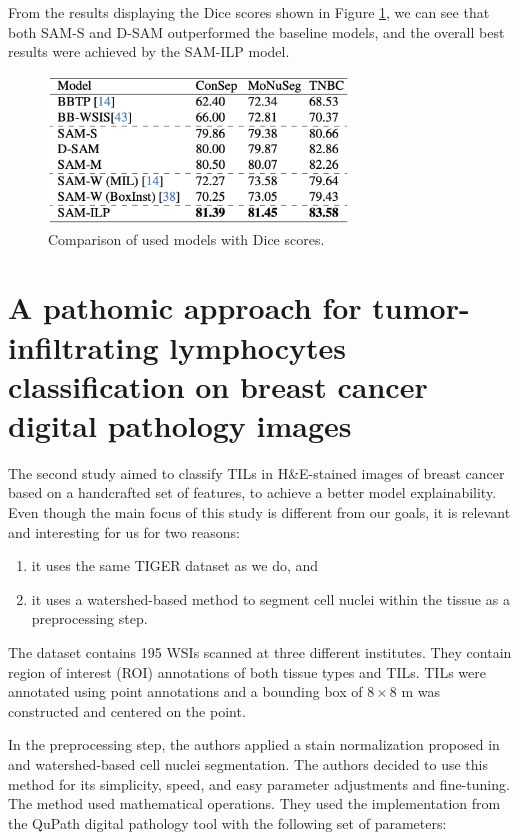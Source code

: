 From the results displaying the Dice scores shown in Figure \ref{fig:rw-sam-dice}, we can see that both SAM-S and D-SAM outperformed the baseline models, and the overall best results were achieved by the SAM-ILP model.

\begin{figure}[H]
    \begin{centering}
    \includegraphics[width=8cm]{assets/images/rw-table-dice.png}
    \par\end{centering}
    \caption{Comparison of used models with Dice scores.}
    \label{fig:rw-sam-dice}
\end{figure}

\section{A pathomic approach for tumor-infiltrating lymphocytes classification on breast cancer digital pathology images \cite{Verdicchio2023}}
\label{section:related-2}

The second study aimed to classify TILs in H\&E-stained images of breast cancer based on a handcrafted set of features, to achieve a better model explainability. Even though the main focus of this study is different from our goals, it is relevant and interesting for us for two reasons:

\begin{enumerate}
    \item it uses the same TIGER dataset \cite{tiger_dataset} as we do, and
    \item it uses a watershed-based method to segment cell nuclei within the tissue as a preprocessing step.
\end{enumerate}

The dataset contains 195 WSIs scanned at three different institutes. They contain region of interest (ROI) annotations of both tissue types and TILs. TILs were annotated using point annotations and a bounding box of $8 \!\times\! 8$ \textmu m was constructed and centered on the point.

In the preprocessing step, the authors applied a stain normalization proposed in \cite{Vahadane2015} and watershed-based cell nuclei segmentation. The authors decided to use this method for its simplicity, speed, and easy parameter adjustments and fine-tuning. The method used mathematical operations. They used the implementation from the QuPath digital pathology tool with the following set of parameters:

